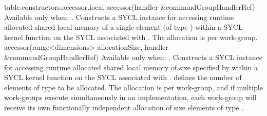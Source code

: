 
{table.constructors.accessor.local}
  \addRow
    { accessor(handler \&commandGroupHandlerRef) }
    {
      Available only when: .
      \newline
      Constructs a SYCL  instance for accessing runtime
      allocated shared local memory of a single element (of type ) within
      a SYCL kernel function on the SYCL  associated with .  The allocation is per work-group.
    }
  \addRowTwoL
    { accessor(range<dimensions> allocationSize, }
    { handler \&commandGroupHandlerRef) }
    {
      Available only when: .
      \newline      
      Constructs a SYCL  instance for accessing runtime
      allocated shared local memory of size specified by  within a SYCL kernel function on the SYCL  associated with .  
      defines the number of elements of type  to be allocated.  The allocation
      is per work-group, and if multiple work-groups execute simultaneously in an
      implementation, each work-group will receive its own functionally independent
      allocation of size  elements of type .
    }
\completeTable

